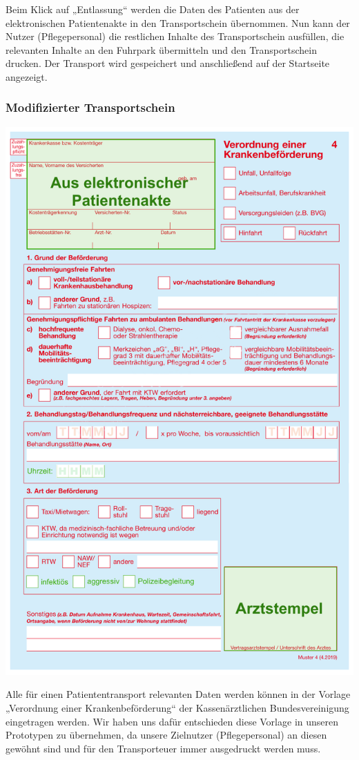 \documentclass[a4paper, ngerman, 12pt]{scrartcl}
\begin{document}
Beim Klick auf „Entlassung“ werden die Daten des Patienten aus der elektronischen Patientenakte in den Transportschein übernommen. Nun kann der Nutzer (Pflegepersonal) die restlichen Inhalte des Transportschein ausfüllen, die relevanten Inhalte an den Fuhrpark übermitteln und den Transportschein drucken. Der Transport wird gespeichert und anschließend auf der Startseite angezeigt.
\subsubsection{Modifizierter Transportschein}
\begin{center}
\begin{minipage}{0.8\textwidth}
	\centering
	\includegraphics[width=\textwidth]{Bilder/Krankentransportmodifiziert.png}
	\label{img:Krankentransportmodifiziert}
\end{minipage}
\end{center}
Alle für einen Patiententransport relevanten Daten werden können in der Vorlage „Verordnung einer Krankenbeförderung“ der Kassenärztlichen Bundesvereinigung eingetragen werden. Wir haben uns dafür entschieden diese Vorlage in unseren Prototypen zu übernehmen, da unsere Zielnutzer (Pflegepersonal) an diesen gewöhnt sind und für den Transporteuer immer ausgedruckt werden muss.\\
\end{document}
